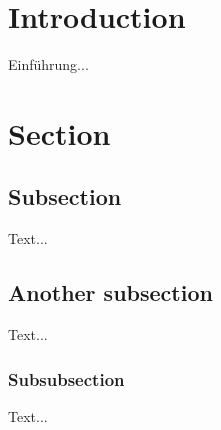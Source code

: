 \documentclass{article}				%
\title{\mytitle}	%
\author{\myauthor}	%
\date{\mydate}		%
\begin{document}
\thispagestyle{empty}

\maketitle

\begin{abstract}
\centering %
Short summary of the document aka abstract.
\end{abstract}

\tableofcontents

\thispagestyle{fancy} %


\section{Introduction}

Einführung...

\section{Section}

\subsection{Subsection}

Text...

\subsection{Another subsection}

Text...

\subsubsection{Subsubsection}

Text...
\end{document}
